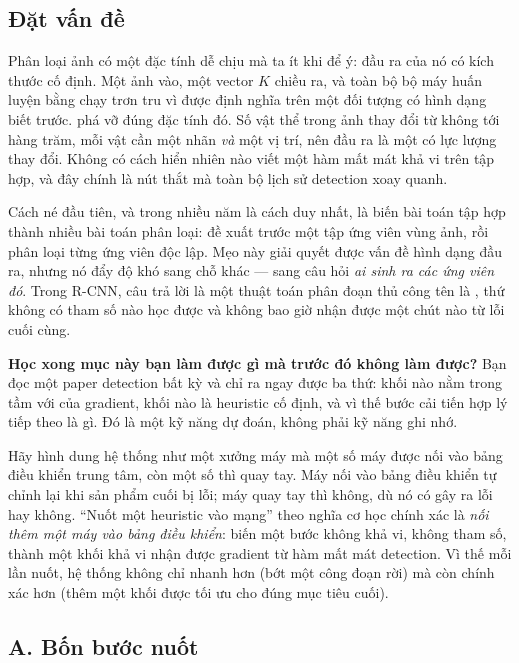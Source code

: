 \documentclass[../../../deep_learning.tex]{subfiles}
\begin{document}
\subsection{Đặt vấn đề}
Phân loại ảnh có một đặc tính dễ chịu mà ta ít khi để ý: đầu ra của nó có kích thước cố định. Một ảnh vào, một vector \(K\) chiều ra, và toàn bộ bộ máy huấn luyện bằng  chạy trơn tru vì  được định nghĩa trên một đối tượng có hình dạng biết trước.  phá vỡ đúng đặc tính đó. Số vật thể trong ảnh thay đổi từ không tới hàng trăm, mỗi vật cần một nhãn \emph{và} một vị trí, nên đầu ra là một  có lực lượng thay đổi. Không có cách hiển nhiên nào viết một hàm mất mát khả vi trên tập hợp, và đây chính là nút thắt mà toàn bộ lịch sử detection xoay quanh.

Cách né đầu tiên, và trong nhiều năm là cách duy nhất, là biến bài toán tập hợp thành nhiều bài toán phân loại: đề xuất trước một tập ứng viên vùng ảnh, rồi phân loại từng ứng viên độc lập. Mẹo này giải quyết được vấn đề hình dạng đầu ra, nhưng nó đẩy độ khó sang chỗ khác --- sang câu hỏi \emph{ai sinh ra các ứng viên đó}. Trong R-CNN, câu trả lời là một thuật toán phân đoạn thủ công tên là , thứ không có tham số nào học được và không bao giờ nhận được một chút  nào từ lỗi cuối cùng.

\textbf{Học xong mục này bạn làm được gì mà trước đó không làm được?} Bạn đọc một paper detection bất kỳ và chỉ ra ngay được ba thứ: khối nào nằm trong tầm với của gradient, khối nào là heuristic cố định, và vì thế bước cải tiến hợp lý tiếp theo là gì. Đó là một kỹ năng dự đoán, không phải kỹ năng ghi nhớ.

\begin{trucgiac}
Hãy hình dung hệ thống như một xưởng máy mà một số máy được nối vào bảng điều khiển trung tâm, còn một số thì quay tay. Máy nối vào bảng điều khiển tự chỉnh lại khi sản phẩm cuối bị lỗi; máy quay tay thì không, dù nó có gây ra lỗi hay không. ``Nuốt một heuristic vào mạng'' theo nghĩa cơ học chính xác là \emph{nối thêm một máy vào bảng điều khiển}: biến một bước không khả vi, không tham số, thành một khối khả vi nhận được gradient từ hàm mất mát detection. Vì thế mỗi lần nuốt, hệ thống không chỉ nhanh hơn (bớt một công đoạn rời) mà còn chính xác hơn (thêm một khối được tối ưu cho đúng mục tiêu cuối).
\end{trucgiac}

\subsection{A. Bốn bước nuốt}
\end{document}

